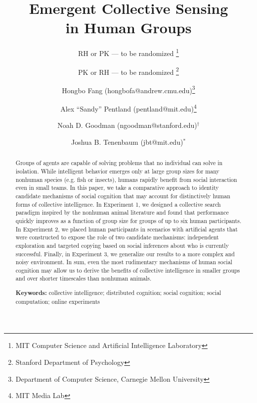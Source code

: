 \documentclass[12pt,letterpaper]{article}
\title{Emergent Collective Sensing \\in Human Groups}
\author{
RH or PK --- to be randomized \thanks{MIT Computer Science and Artificial Intelligence Laboratory}
\vspace{-.5em}
\and 
PK or RH --- to be randomized \thanks{Stanford Department of Psychology}
\vspace{-.5em}
\and 
Hongbo Fang (hongbofa@andrew.cmu.edu)\thanks{Department of Computer Science, Carnegie Mellon University}
\vspace{-.5em}
\and
Alex ``Sandy'' Pentland (pentland@mit.edu)\thanks{MIT Media Lab}
\and 
Noah D. Goodman (ngoodman@stanford.edu)$^\dagger$
\and 
Joshua B. Tenenbaum (jbt@mit.edu)$^*$
}
\date{}
\begin{document}
\maketitle
\vspace{-2em}

\begin{abstract}

Groups of agents are capable of solving problems that no individual can solve in isolation. 
While intelligent behavior emerges only at large group sizes for many nonhuman species (e.g. fish or insects), humans rapidly benefit from social interaction even in small teams. 
In this paper, we take a comparative approach to identity candidate  mechanisms of social cognition that may account for distinctively human forms of collective intelligence. 
In Experiment 1, we designed a collective search paradigm inspired by the nonhuman animal literature and found that performance quickly improves as a function of group size for groups of up to six human participants.
In Experiment 2, we placed human participants in scenarios with artificial agents that were constructed to expose the role of two candidate mechanisms: independent exploration and targeted copying based on social inferences about who is currently successful. 
Finally, in Experiment 3, we generalize our results to a more complex and noisy environment. 
In sum, even the most rudimentary mechanisms of human social cognition may allow us to derive the benefits of collective intelligence in smaller groups and over shorter timescales than nonhuman animals.

\textbf{Keywords:}
  collective intelligence; distributed cognition;
  social cognition; social computation; online experiments
\end{abstract}
\end{document}
